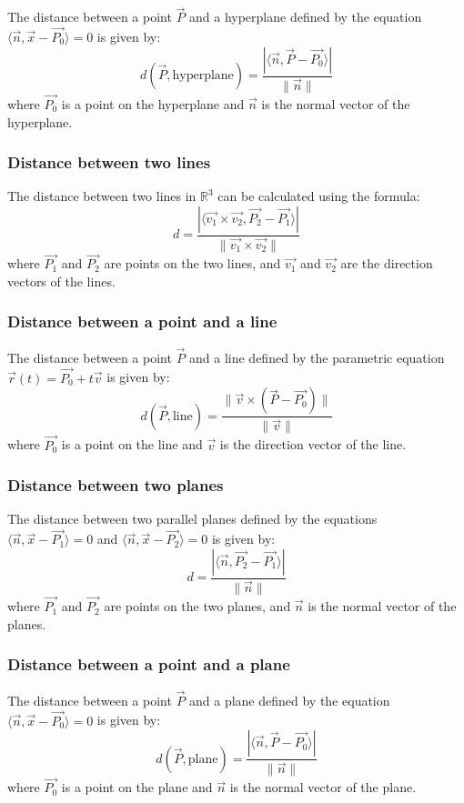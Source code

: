 The distance between a point \(\vec{P}\) and a hyperplane defined by the equation \(\langle \vec{n}, \vec{x} - \vec{P_0} \rangle = 0\) is given by:
\[
	d(\vec{P}, \text{hyperplane}) = \frac{|\langle \vec{n}, \vec{P} - \vec{P_0} \rangle|}{\|\vec{n}\|}
\]
where \(\vec{P_0}\) is a point on the hyperplane and \(\vec{n}\) is the normal vector of the hyperplane.

\subsubsection*{Distance between two lines}

The distance between two lines in \(\mathbb{R}^3\) can be calculated using the formula:
\[
	d = \frac{|\langle \vec{v_1} \times \vec{v_2}, \vec{P_2} - \vec{P_1} \rangle|}{\|\vec{v_1} \times \vec{v_2}\|}
\]
where \(\vec{P_1}\) and \(\vec{P_2}\) are points on the two lines, and \(\vec{v_1}\) and \(\vec{v_2}\) are the direction vectors of the lines.

\subsubsection*{Distance between a point and a line}

The distance between a point \(\vec{P}\) and a line defined by the parametric equation \(\vec{r}(t) = \vec{P_0} + t\vec{v}\) is given by:
\[
	d(\vec{P}, \text{line}) = \frac{\|\vec{v} \times (\vec{P} - \vec{P_0})\|}{\|\vec{v}\|}
\]
where \(\vec{P_0}\) is a point on the line and \(\vec{v}\) is the direction vector of the line.

\subsubsection*{Distance between two planes}

The distance between two parallel planes defined by the equations \(\langle \vec{n}, \vec{x} - \vec{P_1} \rangle = 0\) and \(\langle \vec{n}, \vec{x} - \vec{P_2} \rangle = 0\) is given by:
\[
	d = \frac{|\langle \vec{n}, \vec{P_2} - \vec{P_1} \rangle|}{\|\vec{n}\|}
\]
where \(\vec{P_1}\) and \(\vec{P_2}\) are points on the two planes, and \(\vec{n}\) is the normal vector of the planes.

\subsubsection*{Distance between a point and a plane}

The distance between a point \(\vec{P}\) and a plane defined by the equation \(\langle \vec{n}, \vec{x} - \vec{P_0} \rangle = 0\) is given by:
\[
	d(\vec{P}, \text{plane}) = \frac{|\langle \vec{n}, \vec{P} - \vec{P_0} \rangle|}{\|\vec{n}\|}
\]
where \(\vec{P_0}\) is a point on the plane and \(\vec{n}\) is the normal vector of the plane.

